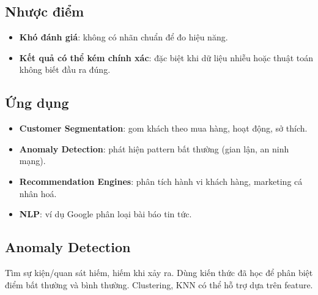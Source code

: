 \subsection{Nhược điểm}

\begin{luuy}[title={Nhược điểm}]
\begin{itemize}
  \item \textbf{Khó đánh giá}: không có nhãn chuẩn để đo hiệu năng.
  \item \textbf{Kết quả có thể kém chính xác}: đặc biệt khi dữ liệu nhiễu hoặc thuật toán không biết đầu ra đúng.
\end{itemize}
\end{luuy}

\subsection{Ứng dụng}

\begin{phuongphap}[title={Thực tế}]
\begin{itemize}
  \item \textbf{Customer Segmentation}: gom khách theo mua hàng, hoạt động, sở thích.
  \item \textbf{Anomaly Detection}: phát hiện pattern bất thường (gian lận, an ninh mạng).
  \item \textbf{Recommendation Engines}: phân tích hành vi khách hàng, marketing cá nhân hoá.
  \item \textbf{NLP}: ví dụ Google phân loại bài báo tin tức.
\end{itemize}
\end{phuongphap}

\subsection{Anomaly Detection}

\begin{dinhnghia}[title={Phát hiện bất thường}]
Tìm sự kiện/quan sát hiếm, hiếm khi xảy ra.
Dùng kiến thức đã học để phân biệt điểm bất thường và bình thường.
Clustering, KNN có thể hỗ trợ dựa trên feature.
\end{dinhnghia}
